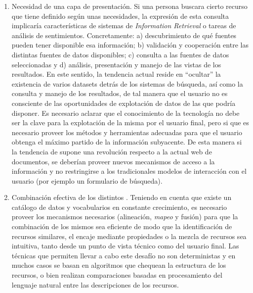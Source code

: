 \begin{enumerate}
 \item Necesidad de una capa de presentación. Si una persona buscara cierto recurso 
 que tiene definido según unas necesidades, la expresión de esta consulta implicaría características de 
sistemas de \textit{Information Retrieval} o tareas de análisis de sentimientos. Concretamente: a) descubrimiento de qué fuentes pueden tener 
disponible esa información; b) validación y cooperación entre las distintas fuentes de datos disponibles; c) consulta a 
las fuentes de datos seleccionadas y d) análisis, presentación y manejo de las vistas de los resultados. En este sentido, la tendencia actual 
reside en ``ocultar'' la existencia de varios datasets detrás de los sistemas de búsqueda, así como la consulta y manejo de los 
resultados, de tal manera que el usuario no es consciente de las oportunidades de explotación de datos de las que podría disponer. 
Es necesario aclarar que el conocimiento de la tecnología no debe ser la clave para la explotación de la misma por el usuario 
final, pero si que es necesario proveer los métodos y herramientas adecuadas para que el usuario obtenga el máximo partido de 
la información subyacente. De esta manera si la tendencia de \linkeddata supone una revolución respecto a la actual web de documentos, se 
deberían proveer nuevos mecanismos de acceso a la información y no restringirse a los tradicionales modelos de interacción con el 
usuario (por ejemplo un formulario de búsqueda). 
\item Combinación efectiva de los distintos \datasets. Teniendo en cuenta que existe un catálogo de datos y 
  vocabularios en constante crecimiento, es necesario proveer los mecanismos necesarios (alineación, \textit{mapeo} y fusión) para que 
la combinación de los mismos sea eficiente de modo que la identificación de recursos similares, el 
encaje mediante propiedades o la mezcla de recursos sea intuitiva, tanto desde un punto de vista técnico como del usuario final. 
Las técnicas que permiten llevar a cabo este desafío no son deterministas y en muchos casos se basan en algoritmos que chequean 
la estructura de los recursos, o bien realizan comparaciones basadas en procesamiento del lenguaje natural entre las descripciones de los recursos.
\end{enumerate}

